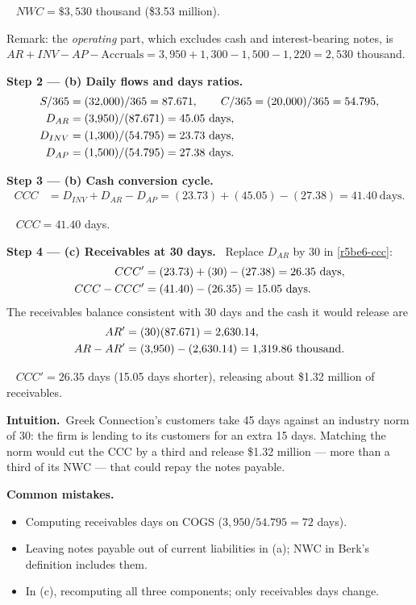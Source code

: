 \documentclass[11pt,a4paper]{article}
\newcommand{\step}[2]{\par\medskip\noindent\textbf{Step #1 --- #2.}~}
\newcommand{\intuition}{\par\medskip\noindent\textbf{Intuition.}~}
\newcommand{\answer}[1]{\par\smallskip\noindent\fbox{\textbf{Answer #1.}}~}
\newcommand{\pitfalls}{\par\medskip\noindent\textbf{Common mistakes.}}
\begin{document}
\answer{(a)} $NWC = \$3{,}530$ thousand (\$3.53 million).

\noindent Remark: the \emph{operating} part, which excludes cash and interest-bearing notes, is
$AR + INV - AP - \text{Accruals} = 3{,}950 + 1{,}300 - 1{,}500 - 1{,}220 = 2{,}530$ thousand.

\step{2}{(b) Daily flows and days ratios}
\begin{align}
  S/365 &= (32{,}000)/365 = 87.671, \qquad C/365 = (20{,}000)/365 = 54.795, \notag\\
  D_{AR} &= (3{,}950)/(87.671) = 45.05 \ \text{days}, \notag\\
  D_{INV} &= (1{,}300)/(54.795) = 23.73 \ \text{days}, \notag\\
  D_{AP} &= (1{,}500)/(54.795) = 27.38 \ \text{days}. \notag
\end{align}

\step{3}{(b) Cash conversion cycle}
\begin{align}
  CCC &= D_{INV} + D_{AR} - D_{AP} = (23.73) + (45.05) - (27.38) = 41.40 \ \text{days}. \label{r5be6-ccc}
\end{align}

\answer{(b)} $CCC = 41.40$ days.

\step{4}{(c) Receivables at 30 days}
Replace $D_{AR}$ by 30 in \eqref{r5be6-ccc}:
\begin{align}
  CCC' &= (23.73) + (30) - (27.38) = 26.35 \ \text{days}, \label{r5be6-cccc}\\
  CCC - CCC' &= (41.40) - (26.35) = 15.05 \ \text{days}. \notag
\end{align}
The receivables balance consistent with 30 days and the cash it would release are
\begin{align}
  AR' &= (30)(87.671) = 2{,}630.14, \notag\\
  AR - AR' &= (3{,}950) - (2{,}630.14) = 1{,}319.86 \ \text{thousand}. \notag
\end{align}

\answer{(c)} $CCC' = 26.35$ days (15.05 days shorter), releasing about \$1.32 million of receivables.

\intuition Greek Connection's customers take 45 days against an industry norm of 30: the firm is
lending to its customers for an extra 15 days. Matching the norm would cut the CCC by a third
and release \$1.32 million --- more than a third of its NWC --- that could repay the notes payable.

\pitfalls
\begin{itemize}
  \item Computing receivables days on COGS ($3{,}950/54.795 = 72$ days).
  \item Leaving notes payable out of current liabilities in (a); NWC in Berk's definition includes them.
  \item In (c), recomputing all three components; only receivables days change.
\end{itemize}
\end{document}
